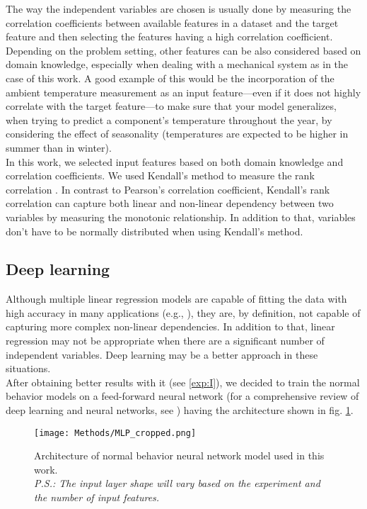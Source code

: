   \par The way the independent variables are chosen is usually done by measuring the correlation coefficients between available features in a
  dataset and the target feature and then selecting the features having a high correlation coefficient. Depending on the problem setting, other features can be also considered 
  based on domain knowledge, especially when dealing with a mechanical system as in the case of this work. A good example of this would be the incorporation of 
  the ambient temperature measurement as an input feature---even if it does not highly correlate with the target feature---to make sure that your model generalizes, when 
  trying to predict a component's temperature throughout the year, by considering the effect of seasonality 
  (temperatures are expected to be higher in summer than in winter).\\
  In this work, we selected input features based on both domain knowledge and correlation coefficients. We used Kendall's method to measure the rank correlation \cite{Kendall}.
  In contrast to Pearson's correlation coefficient, Kendall's rank correlation can capture both linear and non-linear dependency between two variables by 
  measuring the monotonic relationship. In addition to that, variables don't have to be normally distributed when using Kendall's method.

\subsection{Deep learning}
  Although multiple linear regression models are capable of fitting the data with high accuracy in many applications (e.g., \cite{Linear_Regression_Example_1}), they are,
  by definition, not capable of capturing more complex non-linear dependencies. In addition to that, linear regression may not be appropriate when there are a significant 
  number of independent variables. Deep learning may be a better approach in these situations.\\
  After obtaining better results with it (see \ref{exp:I}), we decided to train the normal behavior models
  on a feed-forward neural network (for a comprehensive review of deep learning and neural networks, see \cite{Deep_Learning}) having the architecture shown 
  in fig. \ref{fig:MLP}.

  \begin{figure}[!htbp]
    \begin{center}
      \texttt{[image: Methods/MLP\_cropped.png]}
    \end{center}
    \caption{Architecture of normal behavior neural network model used in this work. \\
    \emph{P.S.: The input layer shape will vary based on the experiment and the number of input features.}}
    \label{fig:MLP}
  \end{figure}

